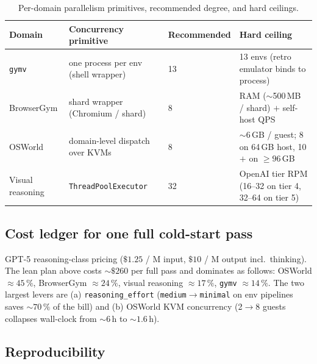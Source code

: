 \begin{table}[t]
\centering
\small
\caption{Per-domain parallelism primitives, recommended degree, and
hard ceilings.}
\label{tab:bench-parallel}
\renewcommand{\arraystretch}{1.10}
\begin{tabular}{@{}llll@{}}
\toprule
\textbf{Domain}   & \textbf{Concurrency primitive}      & \textbf{Recommended} & \textbf{Hard ceiling} \\
\midrule
\texttt{gymv}     & one process per env (shell wrapper) & 13                   & 13 envs (retro emulator binds to process) \\
BrowserGym        & shard wrapper (Chromium / shard)    & 8                    & RAM ($\sim$500\,MB / shard) $+$ self-host QPS \\
OSWorld           & domain-level dispatch over KVMs     & 8                    & $\sim$6\,GB / guest; 8 on 64\,GB host, 10$+$ on $\geq\!96$\,GB \\
Visual reasoning  & \texttt{ThreadPoolExecutor}         & 32                   & OpenAI tier RPM (16--32 on tier 4, 32--64 on tier 5) \\
\bottomrule
\end{tabular}
\end{table}

\subsection{Cost ledger for one full cold-start pass}
\label{app:bench-cost}

GPT-5 reasoning-class pricing ($\$1.25$ / M input, $\$10$ / M output
incl.\ thinking). The lean plan above costs $\sim$$\$260$ per full pass
and dominates as follows: OSWorld $\approx\!45\,\%$, BrowserGym
$\approx\!24\,\%$, visual reasoning $\approx\!17\,\%$,
\texttt{gymv} $\approx\!14\,\%$. The two largest levers are
(a) \texttt{reasoning\_effort} (\texttt{medium}$\!\to\!$\texttt{minimal}
on env pipelines saves $\sim\!70\,\%$ of the bill) and (b) OSWorld KVM
concurrency (2$\!\to\!$8 guests collapses wall-clock from
$\sim\!6$\,h to $\sim\!1.6$\,h).

\subsection{Reproducibility}
\label{app:bench-repro}

